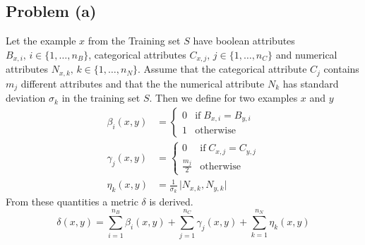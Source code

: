 \subsection*{Problem (a)}

Let the example $x$ from the Training set $S$ have boolean attributes
$B_{x,i},\, i\in\{1,\ldots,n_{B}\}$, categorical attributes $C_{x,j},\, j\in\{1,\ldots,n_{C}\}$
and numerical attributes $N_{x,k},\, k\in\{1,\ldots,n_{N}\}$. Assume
that the categorical attribute $C_{j}$ contains $m_{j}$ different
attributes and that the the numerical attribute $N_{k}$ has standard
deviation $\sigma_{k}$ in the training set $S$. Then we define for
two examples $x$ and $y$
\begin{align*}
\beta_{i}(x,y) & =\begin{cases}
0 & \text{if}\; B_{x,i}=B_{y,i}\\
1 & \text{otherwise}
\end{cases}\\
\gamma_{j}(x,y) & =\begin{cases}
0 & \text{if}\; C_{x,j}=C_{y,j}\\
\frac{m_{j}}{2} & \text{otherwise}
\end{cases}\\
\eta_{k}(x,y) & =\frac{1}{\sigma_{k}}\,\vert N_{x,k},N_{y,k}\vert
\end{align*}
From these quantities a metric $\delta$ is derived.
\[
\delta(x,y)=\sum_{i=1}^{n_{B}}\beta_{i}(x,y)+\sum_{j=1}^{n_{C}}\gamma_{j}(x,y)+\sum_{k=1}^{n_{N}}\eta_{k}(x,y)
\]
